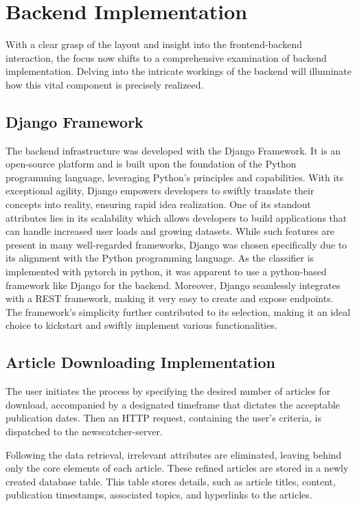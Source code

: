 \documentclass[a4paper,12pt]{report} %
\begin{document}
\section{Backend Implementation}
With a clear grasp of the layout and insight into the frontend-backend interaction, the focus now shifts to a comprehensive examination of backend implementation. Delving into the intricate workings of the backend will illuminate how this vital component is precisely realizeed.

\subsection{Django Framework}
The backend infrastructure was developed with the Django Framework. It is an open-source platform and is built upon the foundation of the Python programming language, leveraging Python's principles and capabilities. With its exceptional agility, Django empowers developers to swiftly translate their concepts into reality, ensuring rapid idea realization. One of its standout attributes lies in its scalability which allows developers to build applications that can handle increased user loads and growing datasets. While such features are present in many well-regarded frameworks, Django was chosen specifically due to its alignment with the Python programming language. As the classifier is implemented with pytorch in python, it was apparent to use a python-based framework like Django for the backend. Moreover, Django seamlessly integrates with a REST framework, making it very easy to create and expose endpoints. The framework's simplicity further contributed to its selection, making it an ideal choice to kickstart and swiftly implement various functionalities.

\subsection{Article Downloading Implementation}
The user initiates the process by specifying the desired number of articles for download, accompanied by a designated timeframe that dictates the acceptable publication dates. Then an HTTP request, containing the user's criteria, is dispatched to the newscatcher-server.

Following the data retrieval, irrelevant attributes are eliminated, leaving behind only the core elements of each article. These refined articles are stored in a newly created database table. This table stores details, such as article titles, content, publication timestamps, associated topics, and hyperlinks to the articles.
\end{document}
